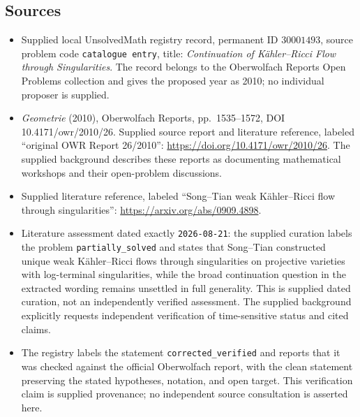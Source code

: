 \documentclass[11pt]{article}
\begin{document}
\subsection{Sources}
\begin{itemize}
\item Supplied local UnsolvedMath registry record, permanent ID \(30001493\), source problem code \texttt{catalogue entry}, title: \emph{Continuation of Kähler--Ricci Flow through Singularities}. The record belongs to the Oberwolfach Reports Open Problems collection and gives the proposed year as 2010; no individual proposer is supplied.
\item \emph{Geometrie} (2010), Oberwolfach Reports, pp.\ 1535--1572, DOI 10.4171/owr/2010/26. Supplied source report and literature reference, labeled ``original OWR Report 26/2010'': \url{https://doi.org/10.4171/owr/2010/26}. The supplied background describes these reports as documenting mathematical workshops and their open-problem discussions.
\item Supplied literature reference, labeled ``Song--Tian weak Kähler--Ricci flow through singularities'': \url{https://arxiv.org/abs/0909.4898}.
\item Literature assessment dated exactly \texttt{2026-08-21}: the supplied curation labels the problem \texttt{partially\_solved} and states that Song--Tian constructed unique weak Kähler--Ricci flows through singularities on projective varieties with log-terminal singularities, while the broad continuation question in the extracted wording remains unsettled in full generality. This is supplied dated curation, not an independently verified assessment. The supplied background explicitly requests independent verification of time-sensitive status and cited claims.
\item The registry labels the statement \texttt{corrected\_verified} and reports that it was checked against the official Oberwolfach report, with the clean statement preserving the stated hypotheses, notation, and open target. This verification claim is supplied provenance; no independent source consultation is asserted here.
\end{itemize}
\end{document}
